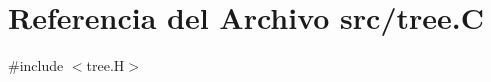 \hypertarget{tree_8_c}{}\section{Referencia del Archivo src/tree.C}
\label{tree_8_c}
{\ttfamily \#include $<$tree.\+H$>$}\newline
